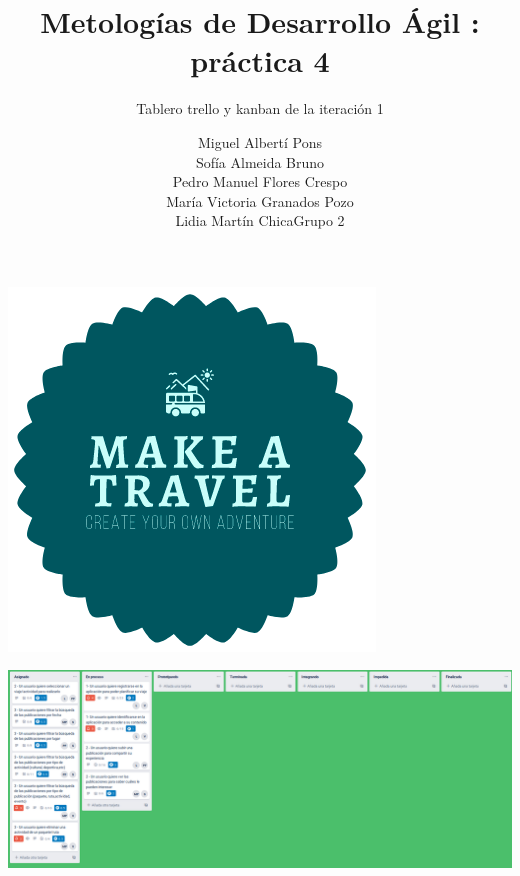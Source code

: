 \documentclass[spanish]{beamer}
\title{Metologías de Desarrollo Ágil : práctica 4}
\subtitle{Tablero trello y kanban de la iteración 1}
\author{Miguel Albertí Pons\\ Sofía Almeida Bruno\\ Pedro Manuel Flores Crespo\\ María Victoria Granados Pozo\\ Lidia Martín Chica\vspace{1em}Grupo 2}
\begin{document}
\maketitle

\begin{frame}
\centering
\begin{center}
		\includegraphics[scale=0.4]{../../Imagenes/Logo}
	\end{center}
\end{frame}

\begin{frame}
\centering
	\begin{center}
		\includegraphics[scale=0.25]{trello1_1}
	\end{center}
\end{frame}
\end{document}
